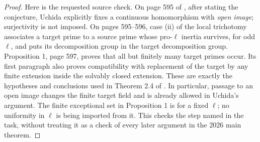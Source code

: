 \documentclass[11pt,oneside]{article}
\begin{document}
\begin{proof}
Here is the requested source check. On page 595 of
\cite{A_Uchida1981}, after stating the conjecture, Uchida
explicitly fixes a continuous homomorphism with \emph{open
image}; surjectivity is not imposed. On pages 595--596,
case (ii) of the local trichotomy associates a target prime
to a source prime whose pro-$\ell$ inertia survives, for
odd $\ell$, and puts its decomposition group in the target
decomposition group. Proposition 1, page 597, proves that
all but finitely many target primes occur. Its first paragraph
also proves compatibility with replacement of the target by
any finite extension inside the solvably closed extension.
These are exactly the hypotheses and conclusions used in
Theorem 2.4 of \cite{A_OpenAI2026Hom}. In particular, passage
to an open image changes the finite target field and is
already allowed in Uchida's argument. The finite exceptional
set in Proposition 1 is for a fixed $\ell$; no uniformity in
$\ell$ is being imported from it. This checks the step named
in the task, without treating it as a check of every later
argument in the 2026 main theorem.
\end{proof}
\end{document}
